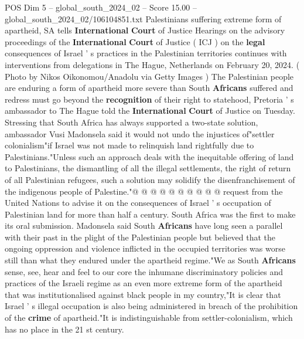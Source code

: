 \begin{textsample}{POS Dim 5 – global\_south\_2024\_02 – Score 15.00 – global\_south\_2024\_02/106104851.txt}  \label{ex:f5_pos_194}
Palestinians suffering extreme form of apartheid, SA tells \textbf{International} \textbf{Court} of Justice Hearings on the advisory proceedings of the \textbf{International} \textbf{Court} of Justice ( ICJ ) on the \textbf{legal} consequences of Israel ' s practices in the Palestinian territories continues with interventions from delegations in The Hague, Netherlands on February 20, 2024. ( Photo by Nikos Oikonomou/Anadolu via Getty Images ) The Palestinian people are enduring a form of apartheid more severe than South \textbf{Africans} suffered and redress must go beyond the \textbf{recognition} of their right to statehood, Pretoria ' s ambassador to The Hague told the \textbf{International} \textbf{Court} of Justice on Tuesday.
Stressing that South Africa has always supported a two-state solution, ambassador Vusi Madonsela said it would not undo the injustices of"settler colonialism"if Israel was not made to relinquish land rightfully due to Palestinians."Unless such an approach deals with the inequitable offering of land to Palestinians, the dismantling of all the illegal settlements, the right of return of all Palestinian refugees, such a solution may solidify the disenfranchisement of the indigenous people of Palestine."@ @ @ @ @ @ @ @ @ @ request from the United Nations to advise it on the consequences of Israel ' s occupation of Palestinian land for more than half a century.
South Africa was the first to make its oral submission.
Madonsela said South \textbf{Africans} have long seen a parallel with their past in the plight of the Palestinian people but believed that the ongoing oppression and violence inflicted in the occupied territories was worse still than what they endured under the apartheid regime."We as South \textbf{Africans} sense, see, hear and feel to our core the inhumane discriminatory policies and practices of the Israeli regime as an even more extreme form of the apartheid that was institutionalised against black people in my country,"It is clear that Israel ' s illegal occupation is also being administered in breach of the prohibition of the \textbf{crime} of apartheid."It is indistinguishable from settler-colonialism, which has no place in the 21 st century.

\end{textsample}
